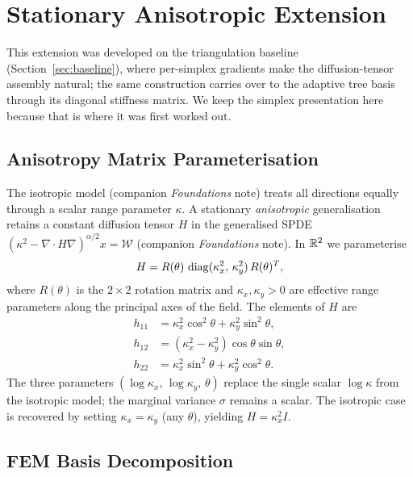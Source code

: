 \documentclass[11pt]{article}
\begin{document}
\section{Stationary Anisotropic Extension}
\label{sec:anisotropic}

This extension was developed on the triangulation baseline
(Section~\ref{sec:baseline}), where per-simplex gradients make the
diffusion-tensor assembly natural; the same construction carries over to the
adaptive tree basis through its diagonal stiffness matrix.  We keep the simplex
presentation here because that is where it was first worked out.

\subsection{Anisotropy Matrix Parameterisation}

The isotropic model (companion \emph{Foundations} note) treats all directions
equally through a scalar range parameter $\kappa$.  A stationary
\emph{anisotropic} generalisation retains a constant diffusion tensor $H$ in the
generalised SPDE $(\kappa^2-\nabla\cdot H\nabla)^{\alpha/2}x=\mathcal{W}$
(companion \emph{Foundations} note).  In $\mathbb{R}^2$ we parameterise
\begin{equation}
  H = R(\theta)\,\operatorname{diag}(\kappa_x^2,\,\kappa_y^2)\,R(\theta)^T,
  \label{eq:H-param}
\end{equation}
where $R(\theta)$ is the $2\times 2$ rotation matrix and $\kappa_x, \kappa_y > 0$
are effective range parameters along the principal axes of the field.
The elements of $H$ are
\begin{align}
  h_{11} &= \kappa_x^2\cos^2\!\theta + \kappa_y^2\sin^2\!\theta, \nonumber\\
  h_{12} &= (\kappa_x^2 - \kappa_y^2)\cos\theta\sin\theta,           \label{eq:H-components} \\
  h_{22} &= \kappa_x^2\sin^2\!\theta + \kappa_y^2\cos^2\!\theta.    \nonumber
\end{align}
The three parameters $(\log\kappa_x,\, \log\kappa_y,\, \theta)$ replace the
single scalar $\log\kappa$ from the isotropic model; the marginal variance
$\sigma$ remains a scalar.  The isotropic case is recovered by setting
$\kappa_x = \kappa_y$ (any $\theta$), yielding $H = \kappa_x^2 I$.

\subsection{FEM Basis Decomposition}
\label{sec:aniso-fem}
\end{document}
